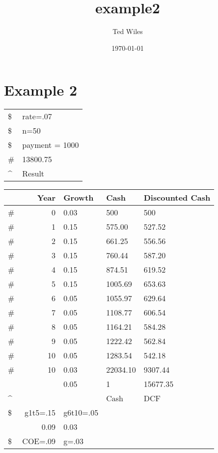 \documentclass[11pt]{article}
\author{Ted Wiles}
\date{\today}
\title{example2}
\begin{document}
\maketitle
\tableofcontents

\section{Example 2}
\label{sec-1}

\begin{tabular}{ll}
\$ \footnotemark & rate=.07\\
\$ & n=50\\
\$ & payment = 1000\\
\# & 13800.75\\
\^{} & Result\\
\end{tabular}

\begin{tabular}{lrlll}
\footnotemark & Year & Growth \footnotemark & Cash & Discounted Cash\\
\hline
\# & 0 & 0.03 & 500 & 500\\
\# & 1 & 0.15 \footnotemark & 575.00 \footnotemark & 527.52 \footnotemark\\
\# & 2 & 0.15 \footnotemark[4]{} & 661.25 \footnotemark[5]{} & 556.56 \footnotemark[6]{}\\
\# & 3 & 0.15 \footnotemark[4]{} & 760.44 \footnotemark[5]{} & 587.20 \footnotemark[6]{}\\
\# & 4 & 0.15 \footnotemark[4]{} & 874.51 \footnotemark[5]{} & 619.52 \footnotemark[6]{}\\
\# & 5 & 0.15 \footnotemark[4]{} & 1005.69 \footnotemark[5]{} & 653.63 \footnotemark[6]{}\\
\# & 6 & 0.05 \footnotemark & 1055.97 \footnotemark[5]{} & 629.64 \footnotemark[6]{}\\
\# & 7 & 0.05 \footnotemark[7]{} & 1108.77 \footnotemark[5]{} & 606.54 \footnotemark[6]{}\\
\# & 8 & 0.05 \footnotemark[7]{} & 1164.21 \footnotemark[5]{} & 584.28 \footnotemark[6]{}\\
\# & 9 & 0.05 \footnotemark[7]{} & 1222.42 \footnotemark[5]{} & 562.84 \footnotemark[6]{}\\
\# & 10 & 0.05 \footnotemark[7]{} & 1283.54 \footnotemark[5]{} & 542.18 \footnotemark[6]{}\\
\# & 10 & 0.03 & 22034.10 \footnotemark & 9307.44 \footnotemark[6]{}\\
 &  & 0.05 & 1 \footnotemark & 15677.35\\
\^{} &  &  & Cash & DCF\\
\$ & g1t5=.15 & g6t10=.05 &  & \\
 & 0.09 & 0.03 &  & \\
\$ & COE=.09 & g=.03 &  & \\
\end{tabular}
\end{document}
